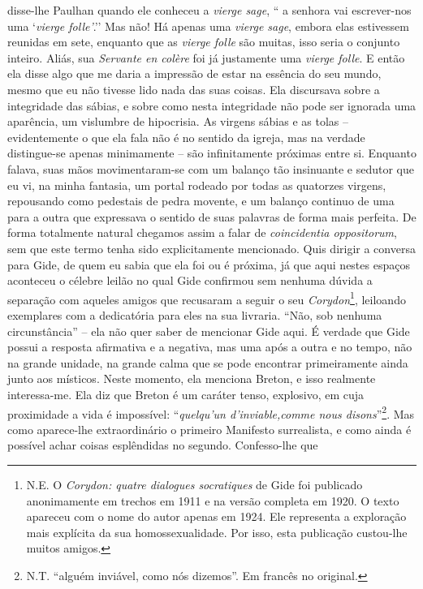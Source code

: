 disse-lhe Paulhan quando ele conheceu a \emph{vierge sage}, `` a senhora
vai escrever-nos uma `\emph{vierge folle'}.'' Mas não! Há apenas uma
\emph{vierge sage}, embora elas estivessem reunidas em sete, enquanto
que as \emph{vierge folle} são muitas, isso seria o conjunto inteiro.
Aliás, sua \emph{Servante en colère} foi já justamente uma \emph{vierge
folle}. E então ela disse algo que me daria a impressão de estar na
essência do seu mundo, mesmo que eu não tivesse lido nada das suas
coisas. Ela discursava sobre a integridade das sábias, e sobre como
nesta integridade não pode ser ignorada uma aparência, um vislumbre de
hipocrisia. As virgens sábias e as tolas -- evidentemente o que ela fala
não é no sentido da igreja, mas na verdade distingue-se apenas
minimamente -- são infinitamente próximas entre si. Enquanto falava,
suas mãos movimentaram-se com um balanço tão insinuante e sedutor que eu
vi, na minha fantasia, um portal rodeado por todas as quatorzes virgens,
repousando como pedestais de pedra movente, e um balanço continuo de uma
para a outra que expressava o sentido de suas palavras de forma mais
perfeita. De forma totalmente natural chegamos assim a falar de
\emph{coincidentia oppositorum}, sem que este termo tenha sido
explicitamente mencionado. Quis dirigir a conversa para Gide, de quem eu
sabia que ela foi ou é próxima, já que aqui nestes espaços aconteceu o
célebre leilão no qual Gide confirmou sem nenhuma dúvida a separação com
aqueles amigos que recusaram a seguir o seu \emph{Corydon}\footnote{N.E.
  O \emph{Corydon: quatre dialogues socratiques} de Gide foi publicado
  anonimamente em trechos em 1911 e na versão completa em 1920. O texto
  apareceu com o nome do autor apenas em 1924. Ele representa a
  exploração mais explícita da sua homossexualidade. Por isso, esta
  publicação custou-lhe muitos amigos.}, leiloando exemplares com a
dedicatória para eles na sua livraria. ``Não, sob nenhuma
circunstância'' -- ela não quer saber de mencionar Gide aqui. É verdade
que Gide possui a resposta afirmativa e a negativa, mas uma após a outra
e no tempo, não na grande unidade, na grande calma que se pode encontrar
primeiramente ainda junto aos místicos. Neste momento, ela menciona
Breton, e isso realmente interessa-me. Ela diz que Breton é um caráter
tenso, explosivo, em cuja proximidade a vida é impossível:
``\emph{quelqu'un d'inviable,comme nous disons}''\footnote{N.T. ``alguém
  inviável, como nós dizemos''. Em francês no original.}. Mas como
aparece-lhe extraordinário o primeiro Manifesto surrealista, e como
ainda é possível achar coisas esplêndidas no segundo. Confesso-lhe que
